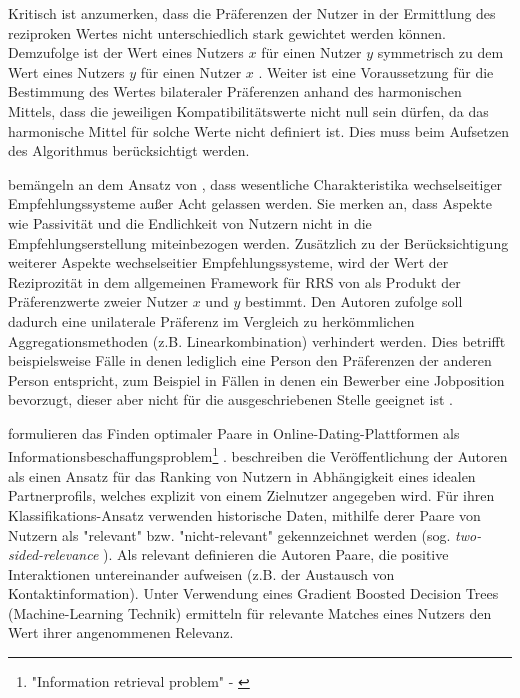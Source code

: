 Kritisch ist anzumerken, dass die Präferenzen der Nutzer in der Ermittlung des reziproken Wertes nicht unterschiedlich stark gewichtet werden können.
Demzufolge ist der Wert eines Nutzers $x$ für einen Nutzer $y$ symmetrisch zu dem Wert eines Nutzers $y$ für einen Nutzer $x$ \cite[S. 211]{pizzato:2010}.
Weiter ist eine Voraussetzung für die Bestimmung des Wertes bilateraler Präferenzen anhand des harmonischen Mittels, dass die jeweiligen Kompatibilitätswerte nicht null sein dürfen, da das harmonische Mittel für solche Werte nicht definiert ist.
Dies muss beim Aufsetzen des Algorithmus berücksichtigt werden.

\textcite[S. 40]{li:inproceedings} bemängeln an dem Ansatz von \textcite[S. 207ff.]{pizzato:2010}, dass wesentliche Charakteristika wechselseitiger Empfehlungssysteme außer Acht gelassen werden.
Sie merken an, dass Aspekte wie Passivität und die Endlichkeit von Nutzern nicht in die Empfehlungserstellung miteinbezogen werden.
Zusätzlich zu der Berücksichtigung weiterer Aspekte wechselseitier Empfehlungssysteme, wird der Wert der Reziprozität in dem allgemeinen Framework für \ac{RRS} von \textcite[S. 38]{li:inproceedings} als Produkt der Präferenzwerte zweier Nutzer $x$ und $y$ bestimmt.
Den Autoren zufolge soll dadurch eine unilaterale Präferenz im Vergleich zu herkömmlichen Aggregationsmethoden (z.B. Linearkombination) verhindert werden.
Dies betrifft beispielsweise Fälle in denen lediglich eine Person den Präferenzen der anderen Person entspricht, zum Beispiel in Fällen in denen ein Bewerber eine Jobposition bevorzugt, dieser aber nicht für die ausgeschriebenen Stelle geeignet ist \cite[S. 38]{li:inproceedings}.

\textcite[S. 66ff.]{diaz:inproceedings} formulieren das Finden optimaler Paare in Online-Dating-Plattformen als Informationsbeschaffungsproblem\footnote{"Information retrieval problem" - \textcite[S. 67]{diaz:inproceedings}} \cite[S. 550]{koprinska:inbook}.
\textcite[S. 550]{koprinska:inbook} beschreiben die Veröffentlichung der Autoren als einen Ansatz für das Ranking von Nutzern in Abhängigkeit eines idealen Partnerprofils, welches explizit von einem Zielnutzer angegeben wird.
Für ihren Klassifikations-Ansatz verwenden \textcite[S. 66ff.]{diaz:inproceedings} historische Daten, mithilfe derer Paare von Nutzern als "relevant" bzw. "nicht-relevant" gekennzeichnet werden (sog. \textit{two-sided-relevance} \cite[S. 288]{li:article}).
Als relevant definieren die Autoren Paare, die positive Interaktionen untereinander aufweisen (z.B. der Austausch von Kontaktinformation).
Unter Verwendung eines Gradient Boosted Decision Trees (Machine-Learning Technik) ermitteln \textcite[S. 69]{diaz:inproceedings} für relevante Matches eines Nutzers den Wert ihrer angenommenen Relevanz.

